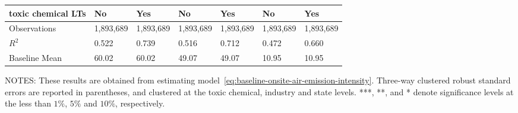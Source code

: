 \begin{table}[H]
{\begin{tabular}{@{}lllllll@{}}
            toxic chemical LTs            & No        & Yes       & No        & Yes       & No        & Yes       \\ \midrule
            Observations                  & 1,893,689 & 1,893,689 & 1,893,689 & 1,893,689 & 1,893,689 & 1,893,689 \\
            $R^2$                         & 0.522     & 0.739     & 0.516     & 0.712     & 0.472     & 0.660     \\
            Baseline Mean                 & 60.02     & 60.02     & 49.07     & 49.07     & 10.95     & 10.95     \\ \bottomrule\bottomrule
        \end{tabular}%
    }
    \begin{minipage}{18cm}
        \vspace{0.05in}
        NOTES: These results are obtained from estimating model~\ref{eq:baseline-onsite-air-emission-intensity}. Three-way clustered robust standard errors are reported in parentheses, and clustered at the toxic chemical, industry and state levels. ***, **, and * denote significance levels at the less than $1\%$, $5\%$ and $10\%$, respectively.
    \end{minipage}
\end{table}